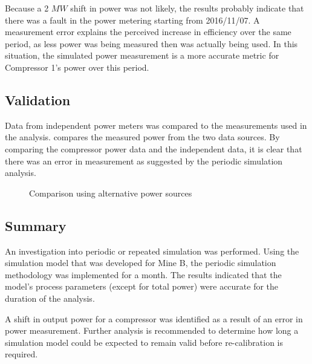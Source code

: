 Because a 2 $MW$ shift in power was not likely, the results probably indicate that there was a fault in the power metering starting from 2016/11/07. A measurement error explains the perceived increase in efficiency over the same period, as less power was being measured then was actually being used. In this situation, the simulated power measurement is a more accurate metric for Compressor 1’s power over this period.

 \subsection{Validation}
Data from independent power meters was compared to the measurements used in the analysis.   compares the measured power from the two data sources. By comparing the compressor power data and the independent data, it is clear that there was an error in measurement as suggested by the periodic simulation analysis.
	\begin{figure}[h!]
		\centering
		
		\caption{Comparison using alternative power sources}
		\label{fig: Corrected Periodic simulation}
	\end{figure} 
	
	\subsection{Summary}
	An investigation into periodic or repeated simulation was performed. Using the simulation model that was developed for Mine B, the periodic simulation methodology was implemented for a month. The results indicated that the model's process parameters (except for total power) were accurate for the duration of the analysis.
	\par 
	 A shift in output power for a compressor  was identified as a result of an error in power measurement. Further analysis is recommended to determine how long a simulation model could be expected to remain valid before re-calibration is required.
	 
